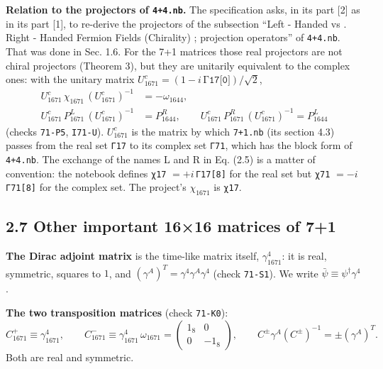 \documentclass[
  10pt,
]{article}
\begin{document}
\textbf{Relation to the projectors of \texttt{4+4.nb}.} The
specification asks, in its part {[}2{]} as in its part {[}1{]}, to
re-derive the projectors of the subsection ``Left - Handed vs . Right -
Handed Fermion Fields (Chirality) ; projection operators'' of
\texttt{4+4.nb}. That was done in Sec. 1.6. For the 7+1 matrices those
real projectors are not chiral projectors (Theorem 3), but they are
unitarily equivalent to the complex ones: with the unitary matrix
\(U_{1671}^{c}=(1-i\,\texttt{Γ17[0]})/\sqrt2\),
\[\begin{aligned}U_{1671}^{c}\,\chi_{1671}\,(U_{1671}^{c})^{-1}&=-\omega_{1644},\\
U_{1671}^{c}\,P_{1671}^{L}\,(U_{1671}^{c})^{-1}&=P_{1644}^{R},\qquad U_{1671}^{c}\,P_{1671}^{R}\,(U_{1671}^{c})^{-1}=P_{1644}^{L}\end{aligned}\tag{2.5}\]
(checks \texttt{71-P5}, \texttt{I71-U}). \(U_{1671}^{c}\) is the matrix
by which \texttt{7+1.nb} (its section 4.3) passes from the real set
\texttt{Γ17} to its complex set \texttt{Γ71}, which has the block form
of \texttt{4+4.nb}. The exchange of the names L and R in Eq. (2.5) is a
matter of convention: the notebook defines \texttt{χ17}
\(=+i\,\)\texttt{Γ17{[}8{]}} for the real set but \texttt{χ71}
\(=-i\,\)\texttt{Γ71{[}8{]}} for the complex set. The project's
\(\chi_{1671}\) is \texttt{χ17}.

\hypertarget{other-important-1616-matrices-of-71}{%
\subsection{2.7 Other important 16×16 matrices of
7+1}\label{other-important-1616-matrices-of-71}}

\textbf{The Dirac adjoint matrix} is the time-like matrix itself,
\(\gamma_{1671}^4\): it is real, symmetric, squares to \(1\), and
\((\gamma^A)^T=\gamma^4\gamma^A\gamma^4\) (check \texttt{71-S1}). We
write \(\bar\psi\equiv\psi^\dagger\gamma^4\).

\textbf{The two transposition matrices} (check \texttt{71-K0}):
\[C_{1671}^{+}\equiv\gamma_{1671}^4,\qquad C_{1671}^{-}\equiv\gamma_{1671}^4\,\omega_{1671}=\begin{pmatrix}1_8&0\\0&-1_8\end{pmatrix},\qquad
C^{\pm}\gamma^A(C^{\pm})^{-1}=\pm(\gamma^A)^T .\tag{2.6}\] Both are real
and symmetric.
\end{document}
